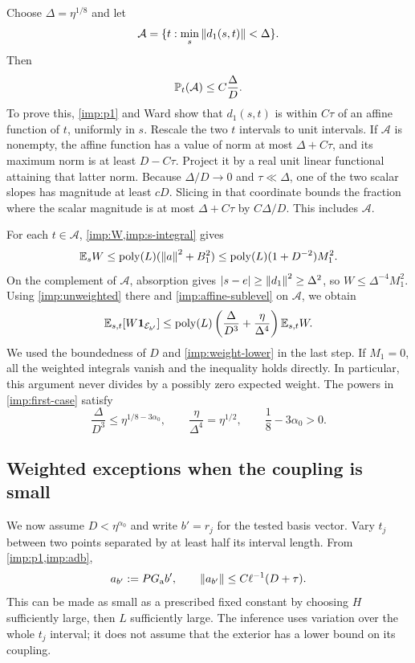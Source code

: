 Choose $\Delta=\eta^{1/8}$ and let
\[
 \mathcal A=\{t:\min_s\left\lVert d_1(s,t)\right\rVert<\Delta\}.
\]
Then
\begin{equation}
 \mathbb P_t(\mathcal A)\le C\frac{\Delta}{D}.
 \label{imp:affine-sublevel}
\end{equation}
To prove this, \cref{imp:p1} and Ward show that $d_1(s,t)$ is within
$C\tau$ of an affine function of $t$, uniformly in $s$. Rescale the two
$t$ intervals to unit intervals. If $\mathcal A$ is nonempty, the affine
function has a value of norm at most $\Delta+C\tau$, and its maximum
norm is at least $D-C\tau$. Project it by a real unit linear functional
attaining that latter norm. Because $\Delta/D\to0$ and $\tau\ll\Delta$,
one of the two scalar slopes has magnitude at least $cD$. Slicing in
that coordinate bounds the fraction where the scalar magnitude is at
most $\Delta+C\tau$ by $C\Delta/D$. This includes $\mathcal A$.

For each $t\in\mathcal A$, \cref{imp:W,imp:s-integral} gives
\[
 \mathbb E_s W\le\operatorname{poly}(L)(\left\lVert a\right\rVert^2+B_1^2)
 \le\operatorname{poly}(L)(1+D^{-2})M_1^2.
\]
On the complement of $\mathcal A$, absorption gives
$\left\lvert s-e\right\rvert\ge\left\lVert d_1\right\rVert^2\ge\Delta^2$, so
$W\le\Delta^{-4}M_1^2$. Using \cref{imp:unweighted} there and
\cref{imp:affine-sublevel} on $\mathcal A$, we obtain
\begin{equation}
 \mathbb E_{s,t}[W\mathbf 1_{\mathcal E_{b'}}]
 \le\operatorname{poly}(L)
     \left(\frac{\Delta}{D^3}+\frac{\eta}{\Delta^4}\right)
     \mathbb E_{s,t}W.
 \label{imp:first-case}
\end{equation}
We used the boundedness of $D$ and \cref{imp:weight-lower} in the last
step. If $M_1=0$, all the weighted integrals vanish and the inequality
holds directly. In particular, this argument never divides by a possibly
zero expected weight. The powers in \cref{imp:first-case} satisfy
\[
 \frac{\Delta}{D^3}\le\eta^{1/8-3\alpha_0},
 \qquad \frac\eta{\Delta^4}=\eta^{1/2},
 \qquad \frac18-3\alpha_0>0.
\]

\subsection{Weighted exceptions when the coupling is small}

We now assume $D<\eta^{\alpha_0}$ and write $b'=r_j$ for the tested
basis vector. Vary $t_j$ between two points separated by at least half
its interval length. From \cref{imp:p1,imp:adb},
\begin{equation}
 a_{b'}:=PG_{\mathrm a}b',
 \qquad
 \left\lVert a_{b'}\right\rVert\le C\ell^{-1}(D+\tau).
 \label{imp:small-b}
\end{equation}
This can be made as small as a prescribed fixed constant by choosing
$H$ sufficiently large, then $L$ sufficiently large. The inference uses
variation over the whole $t_j$ interval; it does not assume that the
exterior has a lower bound on its coupling.

